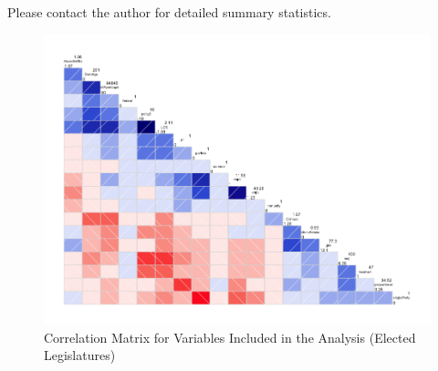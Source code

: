 \documentclass[a4paper]{article}\usepackage{graphicx, color}
\begin{document}
\begin{table}[!h]
\begin{center}
\begin{tabular}{l m{7cm} m{3.5cm}}
    \end{tabular}
    \end{center}
    \begin{singlespace}
        Please contact the author for detailed summary statistics.
    \end{singlespace}
\end{table}  

\begin{landscape}
\begin{figure}[t]
    \caption{Correlation Matrix for Variables Included in the Analysis (Elected Legislatures)}
    \label{corrmatrix}
    \begin{center}
    
    \includegraphics[width = \textwidth]{figure/corScatter.png}  






\end{center}
\end{figure}
\end{landscape}
\end{document}
